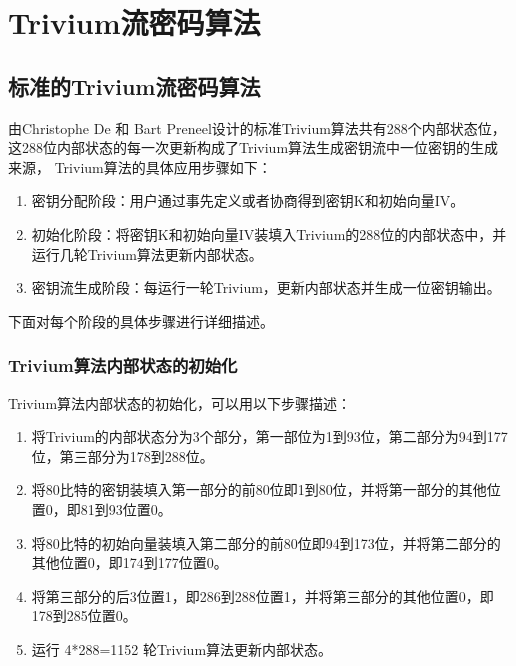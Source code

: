 
\chapter{Trivium流密码算法}

\section{标准的Trivium流密码算法}

由Christophe De 和 Bart Preneel设计的标准Trivium算法共有288个内部状态位，这288位内部状态的每一次更新构成了Trivium算法生成密钥流中一位密钥的生成来源， Trivium算法的具体应用步骤如下：

\begin{enumerate}[label=(\arabic*),noitemsep,topsep=0pt,parsep=0pt,partopsep=0pt]
  \item 密钥分配阶段：用户通过事先定义或者协商得到密钥K和初始向量IV。
  \item 初始化阶段：将密钥K和初始向量IV装填入Trivium的288位的内部状态中，并运行几轮Trivium算法更新内部状态。
  \item 密钥流生成阶段：每运行一轮Trivium，更新内部状态并生成一位密钥输出。
\end{enumerate}

下面对每个阶段的具体步骤进行详细描述。

\subsection{Trivium算法内部状态的初始化}

Trivium算法内部状态的初始化，可以用以下步骤描述：

\begin{enumerate}[label=(\arabic*),noitemsep,topsep=0pt,parsep=0pt,partopsep=0pt]
  \item 将Trivium的内部状态分为3个部分，第一部位为1到93位，第二部分为94到177位，第三部分为178到288位。
  \item 将80比特的密钥装填入第一部分的前80位即1到80位，并将第一部分的其他位置0，即81到93位置0。
  \item 将80比特的初始向量装填入第二部分的前80位即94到173位，并将第二部分的其他位置0，即174到177位置0。
  \item 将第三部分的后3位置1，即286到288位置1，并将第三部分的其他位置0，即178到285位置0。
  \item 运行 4*288=1152 轮Trivium算法更新内部状态。
\end{enumerate}

